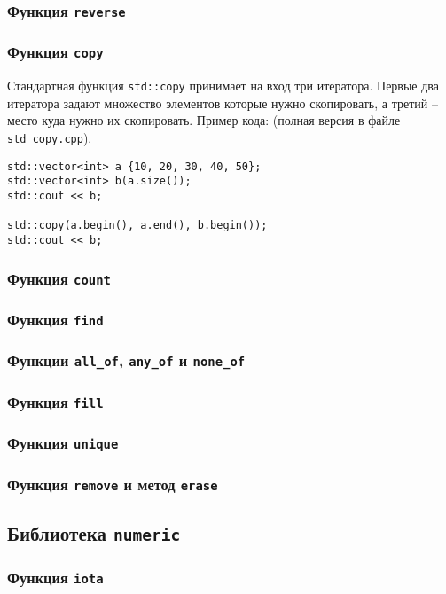 \documentclass{article}
\begin{document}
\subsubsection*{Функция \texttt{reverse}}
\subsubsection*{Функция \texttt{copy}}
Стандартная функция \texttt{std::copy} принимает на вход три итератора. Первые два итератора задают множество элементов которые нужно скопировать, а третий -- место куда нужно их скопировать. Пример кода: (полная версия в файле \texttt{std\_copy.cpp}).
\begin{lstlisting}
std::vector<int> a {10, 20, 30, 40, 50};
std::vector<int> b(a.size());
std::cout << b;

std::copy(a.begin(), a.end(), b.begin());
std::cout << b;
\end{lstlisting}
\subsubsection*{Функция \texttt{count}}
\subsubsection*{Функция \texttt{find}}
\subsubsection*{Функции \texttt{all\_of}, \texttt{any\_of} и \texttt{none\_of}}
\subsubsection*{Функция \texttt{fill}}
\subsubsection*{Функция \texttt{unique}}
\subsubsection*{Функция \texttt{remove} и метод \texttt{erase}}




\subsection*{Библиотека \texttt{numeric}}
\subsubsection*{Функция \texttt{iota}}
\end{document}
